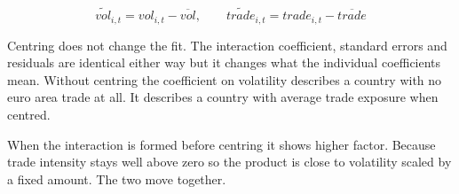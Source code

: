 \begin{equation}\label{centring}
    \widetilde{vol}_{i,t} = vol_{i,t} - \overline{vol}, \qquad
    \widetilde{trade}_{i,t} = trade_{i,t} - \overline{trade}
\end{equation}

\vspace{\baselineskip}

Centring does not change the fit.
The interaction coefficient, standard errors and residuals are identical either way but it changes what the individual coefficients mean.
Without centring the coefficient on volatility describes a country with no euro area trade at all.
It describes a country with average trade exposure when centred.

\vspace{\baselineskip}

When the interaction is formed before centring it shows higher factor.
Because trade intensity stays well above zero so the product is close to volatility scaled by a fixed amount.
The two move together.

